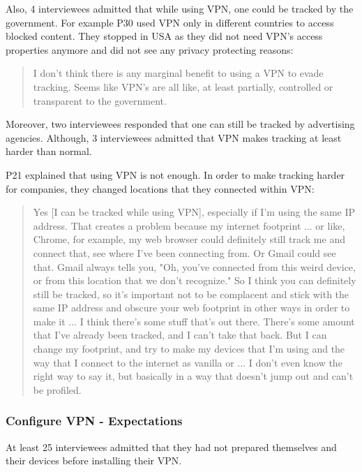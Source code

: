Also, 4 interviewees admitted that while using VPN, one could be tracked by the government. For example P30 used VPN only in different countries to access blocked content. They stopped in USA as they did not need VPN's access properties anymore and did not see any privacy protecting reasons:

\begin{quote}I don't think there is any marginal benefit to using a VPN to evade tracking. Seems like VPN's are all like, at least partially, controlled or transparent to the government.\end{quote}

 Moreover, two interviewees responded that one can still be tracked by advertising agencies. Although, 3 interviewees admitted that VPN makes tracking at least harder than normal. 

P21 explained that using VPN is not enough. In order to make tracking harder for companies, they changed locations that they connected within VPN:
\begin{quote}Yes [I can be tracked while using VPN], especially if I'm using the same IP address. That creates a problem because my internet footprint ... or like, Chrome, for example, my web browser could definitely still track me and connect that, see where I've been connecting from. Or Gmail could see that. Gmail always tells you, "Oh, you've connected from this weird device, or from this location that we don't recognize." So I think you can definitely still be tracked, so it's important not to be complacent and stick with the same IP address and obscure your web footprint in other ways in order to make it ... I think there's some stuff that's out there. There's some amount that I've already been tracked, and I can't take that back. But I can change my footprint, and try to make my devices that I'm using and the way that I connect to the internet as vanilla or ... I don't even know the right way to say it, but basically in a way that doesn't jump out and can't be profiled.\end{quote}


\subsubsection{Configure VPN - Expectations}
At least 25 interviewees admitted that they had not prepared themselves and their devices before installing their VPN.

